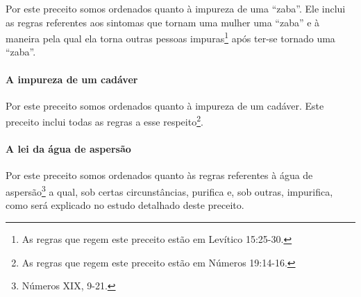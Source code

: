 Por este preceito somos ordenados quanto à impureza de uma ``zaba''.
Ele inclui as regras referentes aos sintomas que tornam uma mulher uma
``zaba'' e à maneira pela qual ela torna outras pessoas
impuras\footnote{As regras que regem este preceito estão em Levítico 15:25-30.} após ter-se tornado uma ``zaba''.

\paragraph{A impureza de um cadáver}

Por este preceito somos ordenados quanto à impureza de um cadáver. Este
preceito inclui todas as regras a esse respeito\footnote{As regras que regem este preceito estão em Números 19:14-16.}.

\paragraph{A lei da água de aspersão}

Por este preceito somos ordenados quanto às regras referentes à água
de aspersão\footnote{Números XIX, 9-21.} a qual, sob certas circunstâncias,
purifica e, sob outras, impurifica, como será explicado no estudo
detalhado deste preceito.

